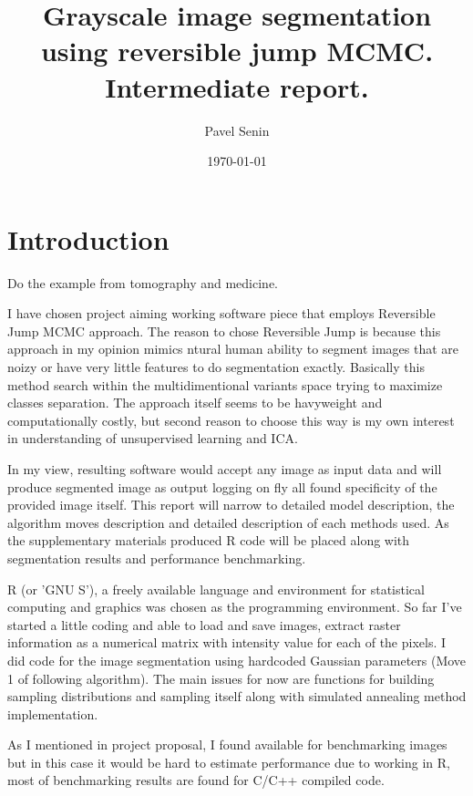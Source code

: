 \documentclass{article}
\title{Grayscale image segmentation using reversible jump MCMC. Intermediate report.}
\author{Pavel Senin}
\date{\today}
\begin{document}
\maketitle
\clearpage
\tableofcontents
\clearpage

\section{Introduction}

Do the example from tomography and medicine.

I have chosen project aiming working software piece that employs Reversible Jump MCMC approach. The reason to chose Reversible Jump is because this approach in my opinion mimics ntural human ability to segment images that are noizy or have very little features to do segmentation exactly. Basically this method search within the multidimentional variants space trying to maximize classes separation. The approach itself seems to be havyweight and computationally costly, but second reason to choose this way is my own interest in understanding of unsupervised learning and ICA. 

In my view, resulting software would accept any image as input data and will produce segmented image as output logging on fly all found specificity of the provided image itself. This report will narrow to detailed model description, the algorithm moves description and detailed description of each methods used. As the supplementary materials produced R code will be placed along with segmentation results and performance benchmarking.

R (or 'GNU S'), a freely available language and environment for statistical computing and graphics was chosen as the programming environment. So far I've started a little coding and able to load and save images, extract raster information as a numerical matrix with intensity value for each of the pixels. I did code for the image segmentation using hardcoded Gaussian parameters (Move 1 of following algorithm). The main issues for now are functions for building sampling distributions and sampling itself along with simulated annealing method implementation.

As I mentioned in project proposal, I found available for benchmarking images but in this case it would be hard to estimate performance due to working in R, most of benchmarking results are found for C/C++ compiled code.
\end{document}
